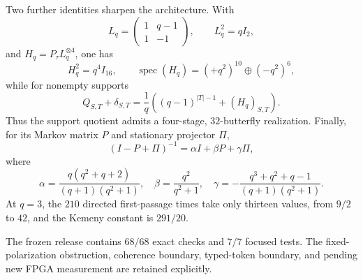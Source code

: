 Two further identities sharpen the architecture.  With
\[
 L_q=\begin{pmatrix}1&q-1\\1&-1\end{pmatrix},\qquad L_q^2=qI_2,
\]
and $H_q=P_\tau L_q^{\otimes4}$, one has
\[
 H_q^2=q^4I_{16},\qquad
 \operatorname{spec}(H_q)=(+q^2)^{10}\oplus(-q^2)^6,
\]
while for nonempty supports
\[
 Q_{S,T}+\delta_{S,T}
 =\frac1q\left((q-1)^{|T|-1}+(H_q)_{S,T}\right).
\]
Thus the support quotient admits a four-stage, $32$-butterfly realization.
Finally, for its Markov matrix $P$ and stationary projector $\Pi$,
\[
 (I-P+\Pi)^{-1}=\alpha I+\beta P+\gamma\Pi,
\]
where
\[
 \alpha=\frac{q(q^2+q+2)}{(q+1)(q^2+1)},\quad
 \beta=\frac{q^2}{q^2+1},\quad
 \gamma=-\frac{q^3+q^2+q-1}{(q+1)(q^2+1)}.
\]
At $q=3$, the $210$ directed first-passage times take only thirteen values,
from $9/2$ to $42$, and the Kemeny constant is $291/20$.

The frozen release contains $68/68$ exact checks and $7/7$ focused tests.
The fixed-polarization obstruction, coherence boundary, typed-token boundary,
and pending new FPGA measurement are retained explicitly.
